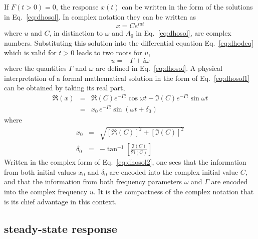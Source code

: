 \documentclass{revtex4}
\begin{document}
If $F(t>0)=0$, the response $x(t)$ can be written in the form of the
solutions in Eq.~\ref{eq:dhosol}.  In complex notation they can be written as
\begin{equation}
x = C e^{iut}
\label{eq:dhosol1}
\end{equation}
where $u$ and $C$, in distinction to $\omega$ and $A_0$ in Eq.~\ref{eq:dhosol},
are complex numbers.  Substituting this solution into the differential
equation Eq.~\ref{eq:dhodeq} which is valid for $t>0$ leads to two roots
for $u$,
\begin{equation}
u=-\Gamma\pm i\omega
\end{equation}
where the quantities $\Gamma$ and $\omega$ are defined in Eq.~\ref{eq:dhosol}.
A physical interpretation of a formal mathematical solution in the form of
Eq.~\ref{eq:dhosol1} can be obtained by taking its real part,
\begin{eqnarray}
\Re(x)&=&\Re(C)e^{-\Gamma t}\cos{\omega t}
        -\Im(C)e^{-\Gamma t}\sin{\omega t} \nonumber\\
        &=& x_0\,e^{-\Gamma t}\sin(\omega t + \delta_0)
\end{eqnarray}
where
\begin{eqnarray}
x_0&=&\sqrt{[\Re(C)]^2+[\Im(C)]^2} \nonumber \\
\delta_0&=&-\tan^{-1}\left[\frac{\Im(C)}{\Re(C)}\right] \nonumber
\end{eqnarray}
Written in the complex form of Eq.~\ref{eq:dhosol2},
one sees that the information from both initial values
$x_0$ and $\delta_0$ are encoded into the complex initial value $C$,
and that the information from both frequency parameters $\omega$ and
$\Gamma$ are encoded into the complex frequency $u$.  It is the compactness
of the complex notation that is its chief advantage in this context.

\subsection{steady-state response}
\end{document}
